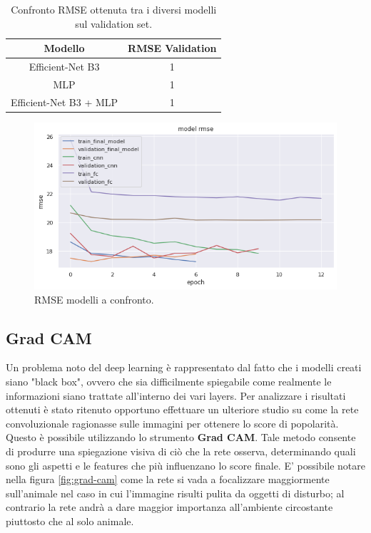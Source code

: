 \vspace{1cm}

\begin{table}[h]
\caption{Confronto RMSE ottenuta tra i diversi modelli sul validation set.}
  \vspace{3mm}
\centering
\begin{tabular}{|c|c|}
\hline
\textbf{Modello}   & \textbf{RMSE Validation} \\ \hline \hline
Efficient-Net B3      & 1               \\ \hline
MLP       & 1               \\ \hline
Efficient-Net B3  + MLP & 1               \\ \hline
\end{tabular}
\label{table:rmse}
\end{table}

\vspace{1cm}

\begin{figure}[h]
    \centering
    
    \includegraphics[scale=0.6]{Plot/ALL_RMSE.png}
    \caption{RMSE modelli a confronto.}
    \label{fig:rmse-all}
\end{figure}





\newpage


\subsection{Grad CAM}

Un problema noto del deep learning è rappresentato dal fatto che i modelli creati siano "black box", ovvero che sia difficilmente spiegabile come realmente le informazioni siano trattate all'interno dei vari layers. Per analizzare i risultati ottenuti è stato ritenuto opportuno effettuare un ulteriore studio su come la rete convoluzionale ragionasse sulle immagini per ottenere lo score di popolarità. Questo è possibile utilizzando lo strumento \textbf{Grad CAM\cite{2019}}. Tale metodo consente di produrre una spiegazione visiva di ciò che la rete osserva, determinando quali sono gli aspetti e le features che più influenzano lo score finale. E' possibile notare nella figura \ref{fig:grad-cam} come la rete si vada a focalizzare maggiormente sull'animale nel caso in cui l'immagine risulti pulita da oggetti di disturbo; al contrario la rete andrà a dare maggior importanza all'ambiente circostante piuttosto che al solo animale.


